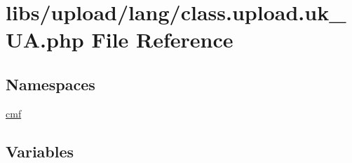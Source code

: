 \hypertarget{class_8upload_8uk___u_a_8php}{}\section{libs/upload/lang/class.upload.\+uk\+\_\+\+U\+A.\+php File Reference}
\label{class_8upload_8uk___u_a_8php}
\subsection*{Namespaces}
\begin{DoxyCompactItemize}
\item 
 \hyperlink{namespacecmf}{cmf}
\end{DoxyCompactItemize}
\subsection*{Variables}
